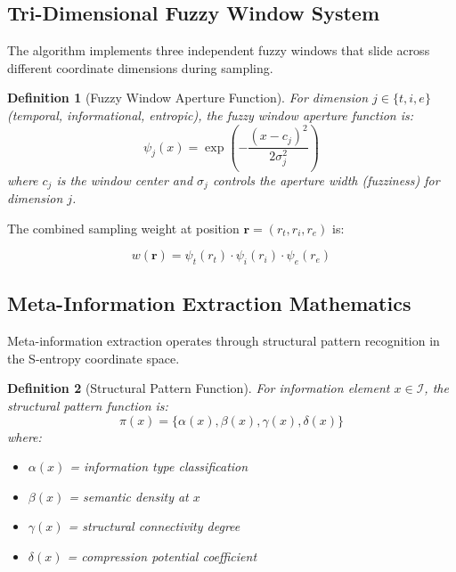 \documentclass[12pt,a4paper]{article}
\newtheorem{definition}{Definition}
\begin{document}
\subsection{Tri-Dimensional Fuzzy Window System}

The algorithm implements three independent fuzzy windows that slide across different coordinate dimensions during sampling.

\begin{definition}[Fuzzy Window Aperture Function]
For dimension $j \in \{t, i, e\}$ (temporal, informational, entropic), the fuzzy window aperture function is:
\begin{equation}
\psi_j(x) = \exp\left(-\frac{(x - c_j)^2}{2\sigma_j^2}\right)
\end{equation}
where $c_j$ is the window center and $\sigma_j$ controls the aperture width (fuzziness) for dimension $j$.
\end{definition}

The combined sampling weight at position $\mathbf{r} = (r_t, r_i, r_e)$ is:

\begin{equation}
w(\mathbf{r}) = \psi_t(r_t) \cdot \psi_i(r_i) \cdot \psi_e(r_e)
\end{equation}

\subsection{Meta-Information Extraction Mathematics}

Meta-information extraction operates through structural pattern recognition in the S-entropy coordinate space.

\begin{definition}[Structural Pattern Function]
For information element $x \in \mathcal{I}$, the structural pattern function is:
\begin{equation}
\pi(x) = \{\alpha(x), \beta(x), \gamma(x), \delta(x)\}
\end{equation}
where:
\begin{itemize}
\item $\alpha(x)$ = information type classification
\item $\beta(x)$ = semantic density at $x$
\item $\gamma(x)$ = structural connectivity degree
\item $\delta(x)$ = compression potential coefficient
\end{itemize}
\end{definition}
\end{document}
